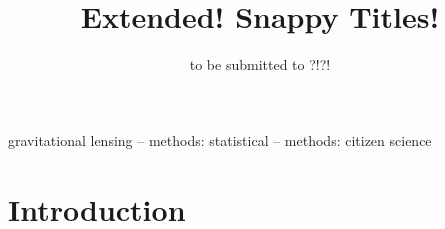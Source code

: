 \documentclass[useAMS,usenatbib,a4paper]{mn2e}
\title[\sw]
{\SW Extended! Snappy Titles!}
\author[Davis et al.]{%
  
}
\begin{document}
             
\date{to be submitted to ?!?!}
\pagerange{\pageref{firstpage}--\pageref{lastpage}}

\maketitle           

\label{firstpage}


\begin{abstract} 


\end{abstract}


\begin{keywords}
  gravitational lensing   --
  methods: statistical    --
  methods: citizen science
\end{keywords}

\setcounter{footnote}{1}


\section{Introduction}
\label{sec:intro}


\end{document}
